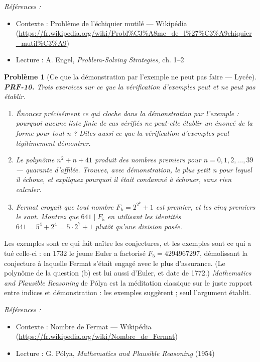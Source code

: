 \documentclass[11pt]{article}
\newtheorem{problem}{Problème}
\newenvironment{refs}{\par\small\noindent\emph{Références :}\begin{itemize}\setlength\itemsep{0pt}}{\end{itemize}\normalsize}
\begin{document}
\begin{refs}
\item Contexte : Problème de l'échiquier mutilé --- Wikipédia (\url{https://fr.wikipedia.org/wiki/Probl%C3%A8me_de_l%27%C3%A9chiquier_mutil%C3%A9})
\item Lecture : A. Engel, \textit{Problem-Solving Strategies}, ch. 1--2
\end{refs}

\bigskip

\begin{problem}[{Ce que la démonstration par l'exemple ne peut pas faire --- Lycée}]
\textbf{PRF-10.} Trois exercices sur ce que la vérification d'exemples peut et ne peut
pas établir.
\begin{enumerate}
\item[(a)] Énoncez précisément ce qui cloche dans la \og{} démonstration par l'exemple \fg{} : pourquoi
aucune liste finie de cas vérifiés ne peut-elle établir un énoncé de la forme \og{} pour tout
n \fg{} ? Dites aussi ce que la vérification d'exemples \textit{peut} légitimement démontrer.
\item[(b)] Le polynôme $ n^2 + n + 41 $ produit des nombres premiers pour
$ n = 0, 1, 2, \dots, 39 $ --- quarante d'affilée. Trouvez, avec démonstration, le plus
petit n pour lequel il échoue, et expliquez pourquoi il était condamné à échouer, sans rien
calculer.
\item[(c)] Fermat croyait que tout nombre $ F_k = 2^{2^k} + 1 $ est premier, et les cinq
premiers le sont. Montrez que $ 641 \mid F_5 $ en utilisant les identités
$ 641 = 5^4 + 2^4 = 5 \cdot 2^7 + 1 $ plutôt qu'une division posée.
\end{enumerate}

\end{problem}

\noindent Les exemples sont ce qui fait naître les conjectures, et les exemples sont
ce qui a tué celle-ci : en 1732 le jeune Euler a factorisé $ F_5 = 4294967297 $, démolissant
la conjecture à laquelle Fermat s'était engagé avec le plus d'assurance. (Le polynôme de la
question (b) est lui aussi d'Euler, et date de 1772.) \textit{Mathematics and Plausible
Reasoning} de Pólya est la méditation classique sur le juste rapport entre indices et
démonstration : les exemples suggèrent ; seul l'argument établit.

\begin{refs}
\item Contexte : Nombre de Fermat --- Wikipédia (\url{https://fr.wikipedia.org/wiki/Nombre_de_Fermat})
\item Lecture : G. Pólya, \textit{Mathematics and Plausible Reasoning} (1954)
\end{refs}
\end{document}
